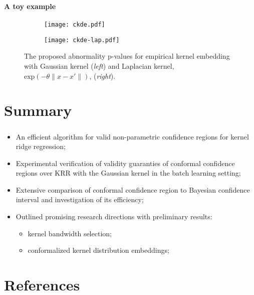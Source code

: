\documentclass[t]{beamer}  %
\begin{document}
\begin{frame}[c]\frametitle{\insertsection}
  \framesubtitle{A toy example}
  \begin{figure}%
    \centering
    \begin{subfigure}[b]{0.45\linewidth}
      \texttt{[image: ckde.pdf]}
    \end{subfigure}%
    \begin{subfigure}[b]{0.45\linewidth}
      \texttt{[image: ckde-lap.pdf]}
    \end{subfigure}%
    \caption{The proposed abnormality p-values for empirical kernel embedding
    with Gaussian kernel (\textit{left}) and Laplacian kernel,
    $\text{exp}(-\theta\|x-x'\|)$, (\textit{right}).}
    \label{fig:ckde}
  \end{figure}
\end{frame}



\section{Summary} %
\label{sec:summary}

\begin{frame}[t]\frametitle{\insertsection}
  \begin{itemize}
    \item An efficient algorithm for valid non-parametric confidence regions for
    kernel ridge regression;

    \vspace{\baselineskip}
    \item Experimental verification of validity guaranties of conformal confidence
    regions over KRR with the Gaussian kernel in the batch learning setting;

    \vspace{\baselineskip}
    \item Extensive comparison of conformal confidence region to Bayesian confidence
    interval and investigation of its efficiency;

    \vspace{\baselineskip}
    \item Outlined promising research directions with preliminary results:
    \begin{itemize}
      \item kernel bandwidth selection;
      \item conformalized kernel distribution embeddings;
    \end{itemize}
  \end{itemize}
\end{frame}


\section{References} %
\label{sec:references}

\begin{frame}[t, shrink=25]\frametitle{\insertsection}
  \printbibliography
\end{frame}

\end{document}

